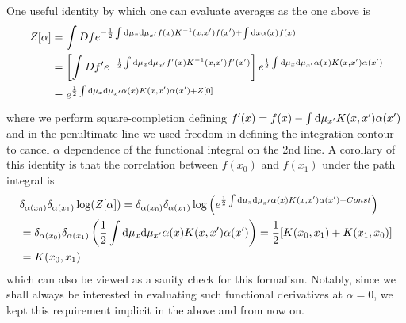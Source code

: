 One useful identity by which one can evaluate averages as the one above is 
\begin{align}
Z[\alpha] &= \int Df  e^{-\frac{1}{2} \int \text{d}\mu_x \text{d}\mu_{x'} f(x) K^{-1}(x,x') f(x')+\int \text{d} x \alpha(x) f(x)} \\ \nonumber 
&= \left[\int Df' e^{-\frac{1}{2} \int \text{d}\mu_x \text{d}\mu_{x'} f'(x) K^{-1}(x,x') f'(x')}\right] e^{\frac{1}{2} \int \text{d}\mu_x \text{d}\mu_{x'} \alpha(x) K(x,x') \alpha(x')} \\ \nonumber 
&= e^{\frac{1}{2} \int \text{d}\mu_x \text{d}\mu_{x'} \alpha(x) K(x,x') \alpha(x')+Z[0]}
\end{align}
where we perform square-completion defining $f'(x) = f(x)-\int \text{d}\mu_{x'} K(x,x') \alpha(x')$ and in the penultimate line we used freedom in defining the integration contour to cancel $\alpha$ dependence of the functional integral on the 2nd line. A corollary of this identity is that the correlation between $f(x_0)$ and $f(x_1)$ under the path integral is 
\begin{align}
&\delta_{\alpha(x_0)} \delta_{\alpha(x_1)}\log(Z[\alpha]) = \delta_{\alpha(x_0)} \delta_{\alpha(x_1)}\log\left( 
e^{\frac{1}{2} \int \text{d}\mu_x \text{d}\mu_{x'} \alpha(x) K(x,x') \alpha(x')+Const} \right) \\ \nonumber 
&= \delta_{\alpha(x_0)} \delta_{\alpha(x_1)} \left( \frac{1}{2} \int \text{d}\mu_x \text{d}\mu_{x'} \alpha(x) K(x,x') \alpha(x')\right) = \frac{1}{2}[K(x_0,x_1)+K(x_1,x_0)] \\ \nonumber 
&=K(x_0,x_1)
\end{align}
which can also be viewed as a sanity check for this formalism. Notably, since we shall always be interested in evaluating such functional derivatives at $\alpha=0$, we kept this requirement implicit in the above and from now on.

